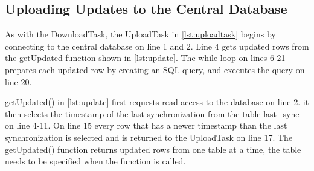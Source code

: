 

\subsection{Uploading Updates to the Central Database}
As with the DownloadTask, the UploadTask in \autoref{lst:uploadtask} begins by connecting to the central database on line 1 and 2. Line 4 gets updated rows from the getUpdated function shown in \autoref{lst:update}. The while loop on lines 6-21 prepares each updated row by creating an SQL query, and executes the query on line 20.



getUpdated() in \autoref{lst:update} first requests read access to the database on line 2. it then selects the timestamp of the last synchronization from the table last\_sync on line 4-11. On line 15 every row that has a newer timestamp than the last synchronization is selected and is returned to the UploadTask on line 17. The getUpdated() function returns updated rows from one table at a time, the table needs to be specified when the function is called.

